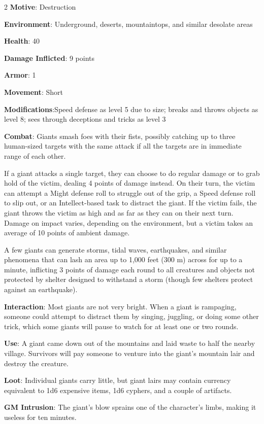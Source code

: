 \begin{multicols}{2}
\textbf{Motive}: Destruction

\textbf{Environment}: Underground, deserts, mountaintops, and similar desolate areas

\textbf{Health}: 40

\textbf{Damage Inflicted}: 9 points

\textbf{Armor}: 1

\textbf{Movement}: Short

\textbf{Modifications}:Speed defense as level 5 due to size; breaks and throws objects as level 8; sees through deceptions and tricks as level 3

\textbf{Combat}: Giants smash foes with their fists, possibly catching up to three human-sized targets with the same attack if all the targets are in immediate range of each other.

If a giant attacks a single target, they can choose to do regular damage or to grab hold of the victim, dealing 4 points of damage instead. On their turn, the victim can attempt a Might defense roll to struggle out of the grip, a Speed defense roll to slip out, or an Intellect-based task to distract the giant. If the victim fails, the giant throws the victim as high and as far as they can on their next turn. Damage on impact varies, depending on the environment, but a victim takes an average of 10 points of ambient damage.

A few giants can generate storms, tidal waves, earthquakes, and similar phenomena that can lash an area up to 1,000 feet (300 m) across for up to a minute, inflicting 3 points of damage each round to all creatures and objects not protected by shelter designed to withstand a storm (though few shelters protect against an earthquake).

\textbf{Interaction}: Most giants are not very bright. When a giant is rampaging, someone could attempt to distract them by singing, juggling, or doing some other trick, which some giants will pause to watch for at least one or two rounds.

\textbf{Use}: A giant came down out of the mountains and laid waste to half the nearby village. Survivors will pay someone to venture into the giant’s mountain lair and destroy the creature.

\textbf{Loot}: Individual giants carry little, but giant lairs may contain currency equivalent to 1d6 expensive items, 1d6 cyphers, and a couple of artifacts.

\textbf{GM Intrusion}: The giant’s blow sprains one of the character’s limbs, making it useless for ten minutes.


\end{multicols}
